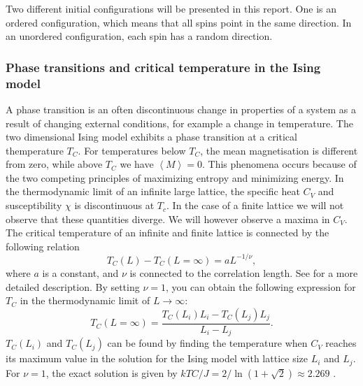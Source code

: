 Two different initial configurations will be presented in this report. One is an ordered configuration, which means that all spins point in the same direction. In an unordered configuration, each spin has a random direction. 

\subsubsection{Phase transitions and critical temperature in the Ising model}
A phase transition is an often discontinuous change in properties of a system as a result of changing external conditions, for example a change in temperature. The two dimensional Ising model exhibits a phase transition at a critical themperature $T_C$. For temperatures below $T_C$, the mean magnetisation is different from zero, while above $T_C$ we have $\left\langle M\right\rangle =0$. This phenomena occurs because of the two competing principles of maximizing entropy and minimizing energy. In the thermodynamic limit of an infinite large lattice, the specific heat $C_V$ and susceptibility $\chi$ is discontinuous at $T_c$. In the case of a finite lattice we will not observe that these quantities diverge. We will however observe a maxima in $C_V$. The critical temperature of an infinite and finite lattice is connected by the following relation    
\begin{equation}
T_C(L) - T_C(L=\infty) = aL^{-1/\nu},
\end{equation}
where $a$ is a constant, and $\nu$ is connected to the correlation length. See \cite{lecturenotes} for a more detailed description. 
By setting $\nu=1$, you can obtain the following expression for $T_C$ in the thermodynamic limit of $L\rightarrow \infty$:
\begin{equation}\label{eq:Tc}
T_C(L=\infty) = \frac{T_C(L_i)L_i-T_C(L_j)L_j}{L_i-L_j}.
\end{equation}
$T_C\left( L_i\right)$ and $T_C\left( L_j\right)$ can be found by finding the temperature when $C_V$ reaches its maximum value in the solution for the Ising model with lattice size $L_i$ and $L_j$. For $\nu=1$, the exact solution is given by $kTC /J = 2/\ln{\left( 1+\sqrt{2}\right)} \approx 2.269$ \cite{tcExact}. 

